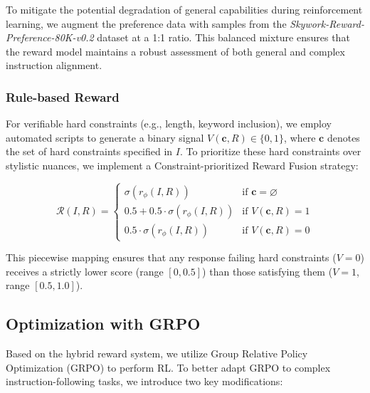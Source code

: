 To mitigate the potential degradation of general capabilities during reinforcement learning, we augment the preference data with samples from the \textit{Skywork-Reward-Preference-80K-v0.2} dataset \citep{liu2025skywork} at a 1:1 ratio. This balanced mixture ensures that the reward model maintains a robust assessment of both general and complex instruction alignment.

\subsubsection{Rule-based Reward}
For verifiable hard constraints (e.g., length, keyword inclusion), we employ automated scripts to generate a binary signal $V(\mathbf{c}, R) \in \{0, 1\}$, where $\mathbf{c}$ denotes the set of hard constraints specified in $I$. To prioritize these hard constraints over stylistic nuances, we implement a Constraint-prioritized Reward Fusion strategy:

\begin{equation}
\mathcal{R}(I, R) =
\begin{cases}
\sigma(r_\phi(I, R)) & \text{if } \mathbf{c} = \varnothing \\
0.5 + 0.5 \cdot \sigma(r_\phi(I, R)) & \text{if } V(\mathbf{c}, R) = 1 \\
0.5 \cdot \sigma(r_\phi(I, R)) & \text{if } V(\mathbf{c}, R) = 0
\end{cases}
\end{equation}

This piecewise mapping ensures that any response failing hard constraints ($V=0$) receives a strictly lower score (range $[0, 0.5]$) than those satisfying them ($V=1$, range $[0.5, 1.0]$).

\subsection{Optimization with GRPO}

Based on the hybrid reward system, we utilize Group Relative Policy Optimization (GRPO) \citep{shao2024deepseekmath} to perform RL. To better adapt GRPO to complex instruction-following tasks, we introduce two key modifications:


